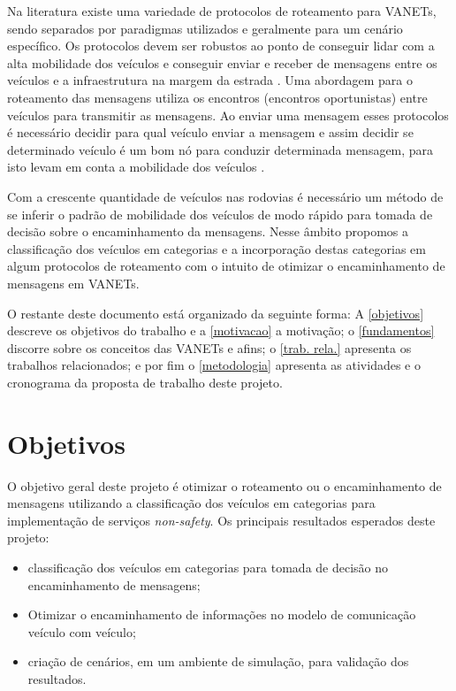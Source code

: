 \documentclass[mestrado, pre-defesa, english, brazil]{packages/icmc}
\begin{document}
Na literatura existe uma variedade de protocolos de roteamento para VANETs, sendo separados por paradigmas utilizados e geralmente para um cenário específico. Os protocolos devem ser robustos ao ponto de conseguir lidar com a alta mobilidade dos veículos e conseguir enviar e receber de mensagens entre os veículos e a infraestrutura na margem da estrada \cite{Alves-2009}. Uma abordagem para o roteamento das mensagens utiliza os encontros (encontros oportunistas) entre veículos para transmitir as mensagens. Ao enviar uma mensagem esses protocolos é necessário decidir para qual veículo enviar a mensagem e assim decidir se determinado veículo é um bom nó para conduzir determinada mensagem, para isto levam em conta a mobilidade dos veículos \cite{costa-2013}.

Com a crescente quantidade de veículos nas rodovias é necessário um método de se inferir o padrão de mobilidade dos veículos de modo rápido para tomada de decisão sobre o encaminhamento da mensagens. Nesse âmbito propomos a classificação dos veículos em categorias e a incorporação destas categorias em algum protocolos de roteamento com o intuito de otimizar o encaminhamento de mensagens em VANETs.

O restante deste documento está organizado da seguinte forma: A \autoref{objetivos} descreve os objetivos do trabalho e a \autoref{motivacao} a motivação; o \autoref{fundamentos} discorre sobre os conceitos das VANETs e afins; o \autoref{trab. rela.} apresenta os trabalhos relacionados; e por fim o \autoref{metodologia} apresenta as atividades e o cronograma da proposta de trabalho deste projeto.

\section{Objetivos} \label{objetivos}

O objetivo geral deste projeto é otimizar o roteamento ou o encaminhamento de mensagens utilizando a classificação dos veículos em categorias para implementação de serviços \textit{non-safety}. Os principais resultados esperados deste projeto:

\begin{itemize}
	\item classificação dos veículos em categorias para tomada de decisão no encaminhamento de mensagens;
	\item Otimizar o encaminhamento de informações no modelo de comunicação veículo com veículo;
	\item criação de cenários, em um ambiente de simulação, para validação dos resultados.
\end{itemize}
\end{document}
